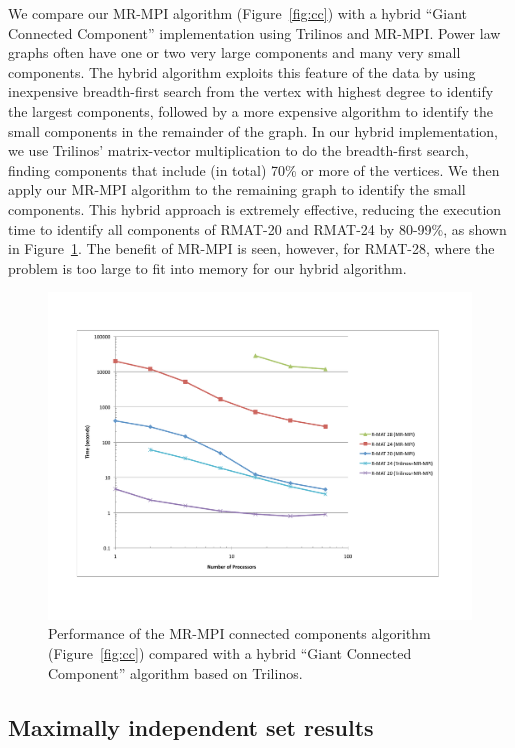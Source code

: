 We compare our MR-MPI algorithm (Figure~\ref{fig:cc}) 
with a hybrid ``Giant Connected Component''
implementation using Trilinos and MR-MPI.  Power law graphs often have one
or two very large components and many very small components.  
The hybrid algorithm exploits this feature of the data by using inexpensive
breadth-first
search from the vertex with highest degree to identify the largest components,
followed by a more expensive algorithm to identify the small components in
the remainder of the graph.  In our hybrid implementation, we use
Trilinos' matrix-vector multiplication to do the breadth-first search, 
finding components that include (in total) 70\% or more of the vertices.
We then apply our MR-MPI algorithm to the remaining graph to identify
the small components.  This hybrid approach is extremely effective,
reducing the execution time to identify all components of RMAT-20 and 
RMAT-24 by 80-99\%, as shown in Figure~\ref{f:cc}.  The benefit of MR-MPI
is seen, however, for RMAT-28, where the problem is too large to fit into
memory for our hybrid algorithm.  

\begin{figure}[htb]
\includegraphics[width=\textwidth]{fig_cc.pdf}
\caption{Performance of the MR-MPI connected components algorithm (Figure~\ref{fig:cc}) compared with a hybrid ``Giant Connected Component'' algorithm based
on Trilinos.}
\label{f:cc}
\end{figure}

\subsection{Maximally independent set results}

